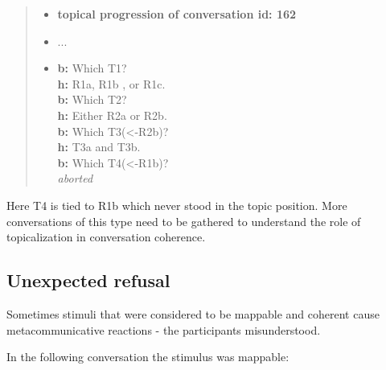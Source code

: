     \newcommand{\topicannot}[3]{
        \textbf{#1} #2 \\
    }

    \begin{quote}
    \begin{itemize}[label={}, leftmargin=0pt, itemsep=0.5em]
    \item \textbf{topical progression of conversation id: 162}
    \item ...
    \item \topicannot{b:}{Which T1?}
    \item \topicannot{h:}{R1a, R1b , or R1c.}
    \item \topicannot{b:}{Which T2?}
    \item \topicannot{h:}{Either R2a or R2b.}
    \item \topicannot{b:}{Which T3(<-R2b)?}
    \item \topicannot{h:}{T3a and T3b.}
    \item \topicannot{b:}{Which T4(<-R1b)?}
    \item \textit{aborted}
    \end{itemize}
    \end{quote}

    Here T4 is tied to R1b which never stood in the topic position.
    More conversations of this type  need to be gathered
    to understand the role of topicalization in conversation coherence.

\subsection{Unexpected refusal}

Sometimes stimuli that were considered to be mappable and coherent
cause metacommunicative reactions - the participants misunderstood.

In the following conversation the stimulus was mappable:

